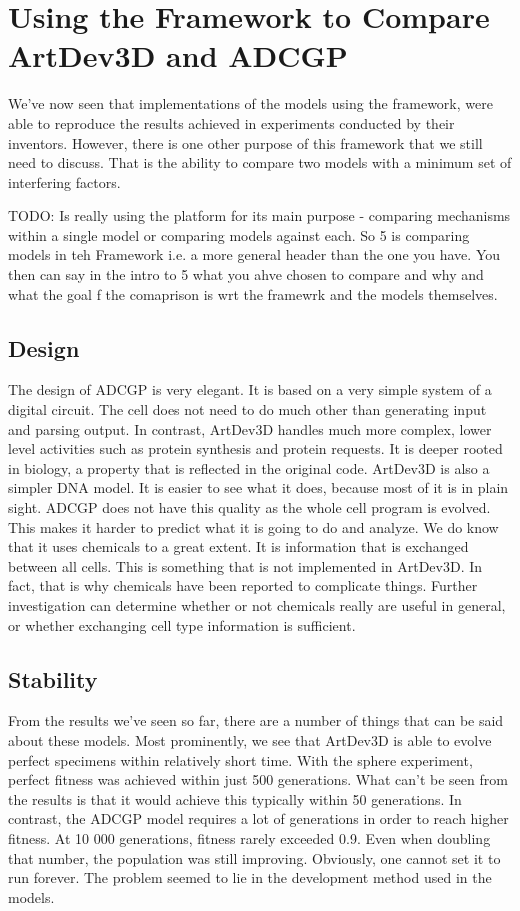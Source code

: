\section{Using the Framework to Compare ArtDev3D and ADCGP}
We've now seen that implementations of the models using the framework, were able to reproduce the results achieved in experiments conducted by their inventors. However, there is one other purpose of this framework that we still need to discuss. That is the ability to compare two models with a minimum set of interfering factors.

TODO:
Is really using the platform for its main purpose - comparing mechanisms within a single model or comparing models against each. So 5 is comparing models in teh Framework i.e. a more general header than the one you have. You then can say in the intro to 5 what you ahve chosen to compare and why and what the goal f the comaprison is wrt the framewrk and the models themselves.


\subsection{Design}
The design of ADCGP is very elegant. It is based on a very simple system of a digital circuit. The cell does not need to do much other than generating input and parsing output. In contrast, ArtDev3D handles much more complex, lower level activities such as protein synthesis and protein requests. It is deeper rooted in biology, a property that is reflected in the original code. ArtDev3D is also a simpler DNA model. It is easier to see what it does, because most of it is in plain sight. ADCGP does not have this quality as the whole cell program is evolved. This makes it harder to predict what it is going to do and analyze. We do know that it uses chemicals to a great extent. It is information that is exchanged between all cells. This is something that is not implemented in ArtDev3D. In fact, that is why chemicals have been reported\cite{hoye2006} to complicate things. Further investigation can determine whether or not chemicals really are useful in general, or whether exchanging cell type information is sufficient.


\subsection{Stability}
From the results we've seen so far, there are a number of things that can be said about these models. Most prominently, we see that ArtDev3D is able to evolve perfect specimens within relatively short time. With the sphere experiment, perfect fitness was achieved within just 500 generations. What can't be seen from the results is that it would achieve this typically within 50 generations. In contrast, the ADCGP model requires a lot of generations in order to reach higher fitness. At 10 000 generations, fitness rarely exceeded 0.9. Even when doubling that number, the population was still improving. Obviously, one cannot set it to run forever. The problem seemed to lie in the development method used in the models.

